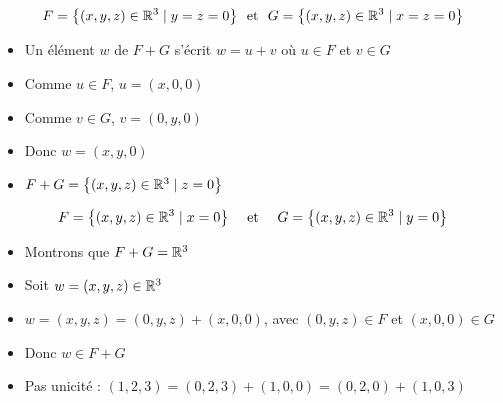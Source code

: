 \begin{frame}
 

\begin{exemple}

$$F=\big\{(x,y,z) \in \mathbb{R}^3\mid y=z=0\big\} 
\ \ \text{et} \ \  
G=\big\{(x,y,z) \in \mathbb{R}^3 \mid x=z=0\big\}$$
\pause
\begin{minipage}{0.39\textwidth}
\end{minipage}
\pause
\begin{minipage}{0.6\textwidth}
\begin{itemize}
  \item Un élément $w$ de $F+G$ s'écrit $w=u+v$ où $u \in F$ et $v \in G$
  \pause
  \item Comme $u\in F$, $u=(x,0,0)$
  \pause
  \item Comme $v \in G$, $v=(0,y,0)$
  \pause
  \item Donc $w=(x,y,0)$
  \pause
  \item $F+G=\big\{(x,y,z) \in \mathbb{R}^3\mid z=0\big\}$
\end{itemize}  
\end{minipage}


\end{exemple}
\end{frame}


\begin{frame}
\begin{exemple}


$$F=\big\{(x,y,z) \in \mathbb{R}^3\mid x=0\big\}
\quad \text{ et } \quad 
G=\big\{(x,y,z) \in \mathbb{R}^3 \mid y=0\big\}$$


\hfill\hfill\begin{minipage}{0.3\textwidth}
\end{minipage}
\vspace*{-12ex}

\pause

\begin{itemize}\setlength{\itemsep}{7pt}
  \item Montrons que $F+G=\mathbb{R}^3$
\pause  
  \item Soit  $w=(x,y,z) \in \mathbb{R}^3$
\pause  
  \item $w=(x,y,z)=(0,y,z)+(x,0,0)$, avec
$(0,y,z) \in F$ et $(x,0,0) \in G$
\pause  
  \item Donc $w \in F+G$
\pause  
  \item Pas unicité : $(1,2,3)=(0,2,3)+ (1,0,0)= (0,2,0)+(1,0,3)$
\end{itemize}
\end{exemple}
\end{frame}



